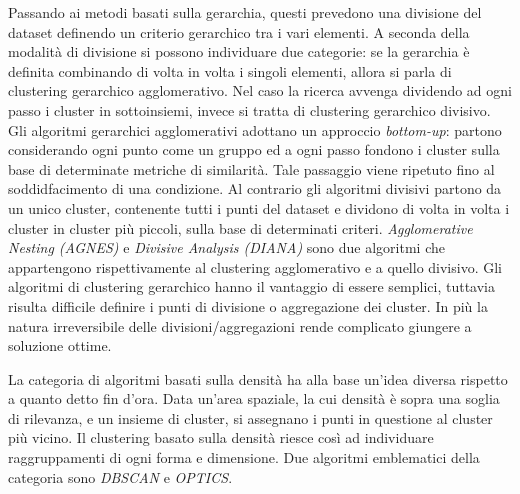 Passando ai metodi basati sulla gerarchia, questi prevedono una divisione del dataset definendo un criterio gerarchico tra i vari elementi.
A seconda della modalità di divisione si possono individuare due categorie: se la gerarchia è definita combinando di volta in volta i singoli elementi,
allora si parla di clustering gerarchico agglomerativo.
Nel caso la ricerca avvenga dividendo ad ogni passo i cluster in sottoinsiemi, invece
si tratta di clustering gerarchico divisivo.
Gli algoritmi gerarchici agglomerativi adottano un approccio \textit{bottom-up}: partono considerando ogni punto come un gruppo ed a ogni passo fondono i cluster sulla base di determinate metriche
di similarità. Tale passaggio viene ripetuto fino al soddidfacimento di una condizione.
Al contrario gli algoritmi divisivi partono da un unico cluster, contenente tutti i punti del dataset e dividono di volta
in volta i cluster in cluster più piccoli, sulla base di determinati criteri.
\textit{Agglomerative Nesting (AGNES)}\cite{kaufman2008agglomerative} e \textit{Divisive Analysis (DIANA)}\cite{kaufman2008divisive} sono due algoritmi che
appartengono rispettivamente al clustering agglomerativo e a quello divisivo.
Gli algoritmi di clustering gerarchico hanno il vantaggio di essere semplici, tuttavia risulta
difficile definire i punti di divisione o aggregazione dei cluster.
In più la natura irreversibile delle divisioni/aggregazioni rende complicato giungere a soluzione ottime.

La categoria di algoritmi basati sulla densità ha alla base un'idea diversa rispetto a quanto detto fin d'ora.
Data un'area spaziale, la cui densità è sopra una soglia di rilevanza, e un insieme di cluster, si assegnano i punti in questione al cluster più vicino.
Il clustering basato sulla densità riesce così ad individuare raggruppamenti di ogni forma e dimensione.
Due algoritmi emblematici della categoria sono \textit{DBSCAN}\cite{ester1996density} e \textit{OPTICS}\cite{ankerst1999optics}.

